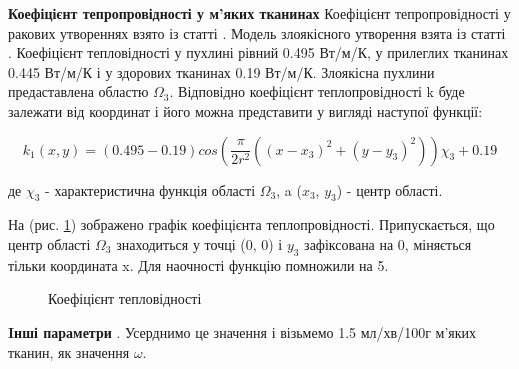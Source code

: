 \textbf{Коефіцієнт тепропровідності у м'яких тканинах} Коефіцієнт тепропровідності у ракових утвореннях взято із статті 
\cite{lung-tumor-thermal-conductivity}. Модель злоякісного утворення взята із статті \cite{tumor-thermal-model}.
Коефіцієнт тепловідності у пухлині рівний 0.495 Вт/м/К, у прилеглих тканинах 0.445 Вт/м/К і у здорових тканинах 
0.19 Вт/м/К. Злоякісна пухлини предаставлена областю $\Omega_3$. Відповідно коефіцієнт теплопровідності k буде залежати
від координат і його можна представити у вигляді наступої функції:

\begin{equation}
    \label{eqn:thermo_2d_thermal_conductivity}
    k_1(x, y) = (0.495 - 0.19)cos(\frac{\pi}{2r^2}((x - x_3)^2 + (y - y_3)^2))\chi_3 + 0.19
\end{equation}

\noindent де $\chi_3$ - характеристична функція області $\Omega_3$, a ($x_3$, $y_3$) - центр області.

\noindent На (рис. \ref{fig:thermo_2d_thermal_conductivity}) зображено графік коефіцієнта теплопровідності. 
Припускається, що центр області $\Omega_3$ знаходиться у точці (0, 0) і $y_3$ зафіксована на 0, міняється тільки 
координата x. Для наочності функцію помножили на 5. 

\begin{figure}[ht!]
    \centering
    \caption{Коефіцієнт тепловідності}
    \label{fig:thermo_2d_thermal_conductivity}
\end{figure}

\textbf{Iнші параметри} \cite[Пеннес змоделював руку як довгий цилінд і обчислив стаціонарний розроділ температури. 
У його моделі не можна було просто виміряти перфузію крові через м'які тканини $\omega$, тому Пеннес узгодив цей 
параметр із експерементальними даними для фіксованої {\hl???ambient???} температури і метаболічного виділення тепла. Він 
отримав значення перфузії крові $\omega$ між 1.2 і 1.8 мл/хв/100г м'яких тканин, що є типовими діапазоном значень для
м'язів людської руки у стані спокою]{kutz-zhu-heat-transfer-biological-systems}. Усерднимо це значення і візьмемо 
1.5 мл/хв/100г м'яких тканин, як значення $\omega$.

